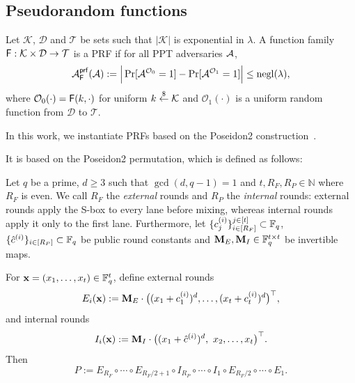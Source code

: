 \subsection{Pseudorandom functions}
\label{subsec:prelim-prf}
\label{subsec:prf}


\begin{definition}\label{def:prf}
Let $\mathcal{K}$, $\mathcal{D}$ and $\mathcal{T}$ be sets such that $|\mathcal{K}|$ is exponential in $\lambda$.
A function family $\mathsf{F}:\mathcal{K}\times\mathcal{D}\to \mathcal{T}$ is a PRF if for all PPT adversaries
$\mathcal{A}$,
\[
  \mathcal{A}^{\mathsf{prf}}_{\mathsf{F}}(\mathcal{A})
  := \Big|\Pr[\mathcal{A}^{\mathcal{O}_0}=1]-\Pr[\mathcal{A}^{\mathcal{O}_1}=1]\Big|
  \le \mathrm{negl}(\lambda),
\]
where $\mathcal{O}_0(\cdot)=\mathsf{F}(k,\cdot)$ for uniform $k\overset{\$}{\leftarrow} \mathcal{K}$ and $\mathcal{O}_1(\cdot)$ is a uniform
random function from $\mathcal{D}$ to $\mathcal{T}$.
\end{definition}


In this work, we instantiate PRFs based on the Poseidon2 construction~\cite{AFRICACRYPT:GraKhoSch23}.

It is based on the Poseidon2 permutation, which is defined as follows:
\begin{definition}\label{def:poseidon-perm}
		Let $q$ be a prime, $d\ge 3$ such that $\gcd(d,q-1)=1$ and $t,R_F,R_P\in \mathbb{N}$ where $R_F$ is even.
		We call $R_F$ the \emph{external} rounds and $R_P$ the  \emph{internal} rounds: external rounds apply the S-box
		to every lane before mixing, whereas internal rounds apply it only to the first lane. Furthermore, let
		 $\{c^{(i)}_j\}_{i\in [R_F]}^{j\in [t]}\subset\mathbb{F}_q$, $\{\hat c^{(i)}\}_{i\in [R_P]}\subset\mathbb{F}_q$ be public round constants and $\mathbf{M}_E,\mathbf{M}_I\in\mathbb{F}_q^{t\times t}$ be invertible maps.
	
	For $\mathbf{x}=(x_1,\dots,x_t)\in\mathbb{F}_q^t$, define external rounds
	\[
	E_i(\mathbf{x}) := \mathbf{M}_E \cdot \big((x_1+c^{(i)}_1)^d,\dots,(x_t+c^{(i)}_t)^d\big)^\top,
	\]
	and internal rounds
	\[
	I_i(\mathbf{x}) := \mathbf{M}_I \cdot \big((x_1+\hat c^{(i)})^d,\ x_2,\dots,x_t\big)^\top.
	\]
	Then
	\[
	P := E_{R_F}\circ\cdots\circ E_{R_F/2+1}\circ I_{R_P}\circ\cdots\circ I_{1}\circ E_{R_F/2}\circ\cdots\circ E_1.
	\]
\end{definition}

